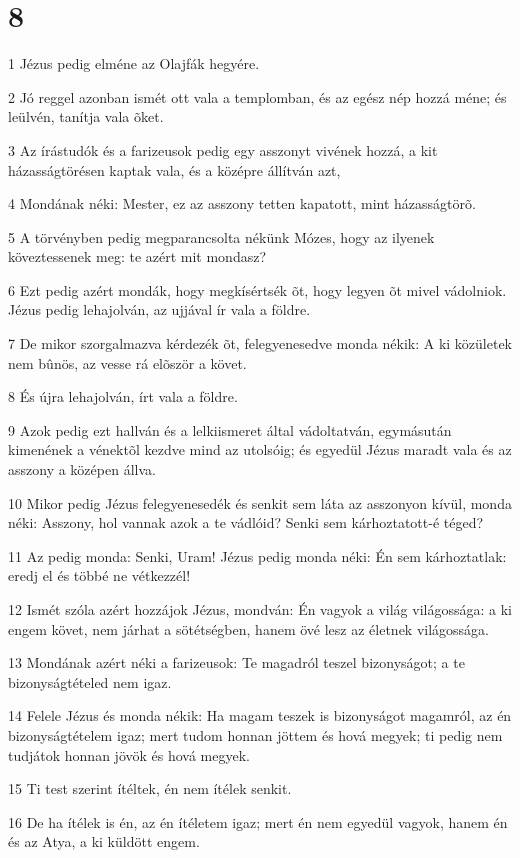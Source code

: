 \chapter{8}

\par 1 Jézus pedig elméne az Olajfák hegyére.
\par 2 Jó reggel azonban ismét ott vala a templomban, és az egész nép hozzá méne; és leülvén, tanítja vala õket.
\par 3 Az írástudók és a farizeusok pedig egy asszonyt vivének hozzá, a kit házasságtörésen kaptak vala, és a középre állítván azt,
\par 4 Mondának néki: Mester, ez az asszony tetten kapatott, mint házasságtörõ.
\par 5 A törvényben pedig megparancsolta nékünk Mózes, hogy az ilyenek köveztessenek meg: te azért mit mondasz?
\par 6 Ezt pedig azért mondák, hogy megkísértsék õt, hogy legyen õt mivel vádolniok. Jézus pedig lehajolván, az ujjával ír vala a földre.
\par 7 De mikor szorgalmazva kérdezék õt, felegyenesedve monda nékik: A ki közületek nem bûnös, az vesse rá elõször a követ.
\par 8 És újra lehajolván, írt vala a földre.
\par 9 Azok pedig ezt hallván és a lelkiismeret által vádoltatván, egymásután kimenének a vénektõl kezdve mind az utolsóig; és egyedül Jézus maradt vala és az asszony a középen állva.
\par 10 Mikor pedig Jézus felegyenesedék és senkit sem láta az asszonyon kívül, monda néki: Asszony, hol vannak azok a te vádlóid? Senki sem kárhoztatott-é téged?
\par 11 Az pedig monda: Senki, Uram! Jézus pedig monda néki: Én sem kárhoztatlak: eredj el és többé ne vétkezzél!
\par 12 Ismét szóla azért hozzájok Jézus, mondván: Én vagyok a világ világossága: a ki engem követ, nem járhat a sötétségben, hanem övé lesz az életnek világossága.
\par 13 Mondának azért néki a farizeusok: Te magadról teszel bizonyságot; a te bizonyságtételed nem igaz.
\par 14 Felele Jézus és monda nékik: Ha magam teszek is bizonyságot magamról, az én bizonyságtételem igaz; mert tudom honnan jöttem és hová megyek; ti pedig nem tudjátok honnan jövök  és hová megyek.
\par 15 Ti test szerint ítéltek, én nem ítélek senkit.
\par 16 De ha ítélek is én, az én ítéletem igaz; mert én nem egyedül vagyok, hanem én és az Atya, a ki küldött engem.
